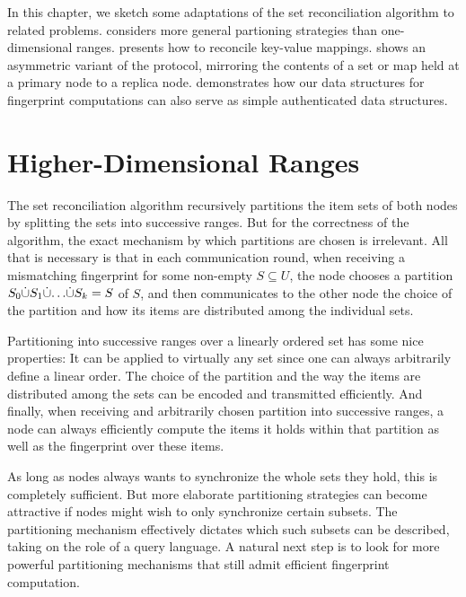 
In this chapter, we sketch some adaptations of the set reconciliation algorithm to related problems.  considers more general partioning strategies than one-dimensional ranges.  presents how to reconcile key-value mappings.  shows an asymmetric variant of the protocol, mirroring the contents of a set or map held at a primary node to a replica node.  demonstrates how our data structures for fingerprint computations can also serve as simple authenticated data structures.

\section{Higher-Dimensional Ranges}
\label{general-partitions}

The set reconciliation algorithm recursively partitions the item sets of both nodes by splitting the sets into successive ranges. But for the correctness of the algorithm, the exact mechanism by which partitions are chosen is irrelevant. All that is necessary is that in each communication round, when receiving a mismatching fingerprint for some non-empty $S \subseteq U$, the node chooses a partition ${S_0} \dot{\cup} {{S_1} \dot{\cup} {{\ldots} \dot{\cup} {S_k}}} = S$ of $S$, and then communicates to the other node the choice of the partition and how its items are distributed among the individual sets.

Partitioning into successive ranges over a linearly ordered set has some nice properties: It can be applied to virtually any set since one can always arbitrarily define a linear order. The choice of the partition and the way the items are distributed among the sets can be encoded and transmitted efficiently. And finally, when receiving and arbitrarily chosen partition into successive ranges, a node can always efficiently compute the items it holds within that partition as well as the fingerprint over these items.

As long as nodes always wants to synchronize the whole sets they hold, this is completely sufficient. But more elaborate partitioning strategies can become attractive if nodes might wish to only synchronize certain subsets. The partitioning mechanism effectively dictates which such subsets can be described, taking on the role of a query language. A natural next step is to look for more powerful partitioning mechanisms that still admit efficient fingerprint computation.

